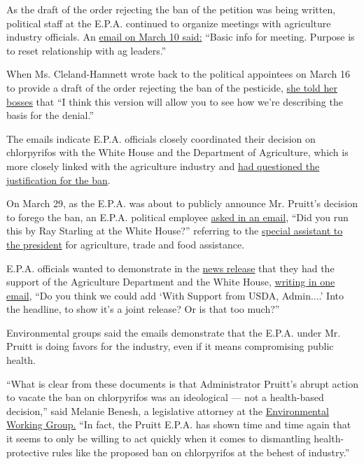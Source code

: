 As the draft of the order rejecting the ban of the petition was being
written, political staff at the E.P.A. continued to organize meetings
with agriculture industry officials. An
\href{https://www.documentcloud.org/documents/3935290-EPA-HQ-2017-005731-Redacted.html\#document/p317/a369104}{email
on March 10 said:} ``Basic info for meeting. Purpose is to reset
relationship with ag leaders.''

When Ms. Cleland-Hamnett wrote back to the political appointees on March
16 to provide a draft of the order rejecting the ban of the pesticide,
\href{https://www.documentcloud.org/documents/3935290-EPA-HQ-2017-005731-Redacted.html\#document/p301/a369109}{she
told her bosses} that ``I think this version will allow you to see how
we're describing the basis for the denial.''

The emails indicate E.P.A. officials closely coordinated their decision
on chlorpyrifos with the White House and the Department of Agriculture,
which is more closely linked with the agriculture industry and
\href{https://www.documentcloud.org/documents/3935263-2017-1-17-USDA-COMMENT-DONT-APPROVE-PETITION.html}{had
questioned the justification for the ban}.

On March 29, as the E.P.A. was about to publicly announce Mr. Pruitt's
decision to forego the ban, an E.P.A. political employee
\href{https://www.documentcloud.org/documents/3935290-EPA-HQ-2017-005731-Redacted.html\#document/p357/a369105}{asked
in an email}, ``Did you run this by Ray Starling at the White House?''
referring to the
\href{https://www.whitehouse.gov/the-press-office/2017/02/27/white-house-national-economic-council-director-announces-senior-staff}{special
assistant to the president} for agriculture, trade and food assistance.

E.P.A. officials wanted to demonstrate in the
\href{https://www.epa.gov/newsreleases/epa-administrator-pruitt-denies-petition-ban-widely-used-pesticide-0}{news
release} that they had the support of the Agriculture Department and the
White House,
\href{https://www.documentcloud.org/documents/3935290-EPA-HQ-2017-005731-Redacted.html\#document/p141/a369102}{writing
in one email}, ``Do you think we could add `With Support from USDA,
Admin....' Into the headline, to show it's a joint release? Or is that
too much?''

Environmental groups said the emails demonstrate that the E.P.A. under
Mr. Pruitt is doing favors for the industry, even if it means
compromising public health.

``What is clear from these documents is that Administrator Pruitt's
abrupt action to vacate the ban on chlorpyrifos was an ideological ---
not a health-based decision,'' said Melanie Benesh, a legislative
attorney at the \href{http://www.ewg.org/}{Environmental Working Group.}
``In fact, the Pruitt E.P.A. has shown time and time again that it seems
to only be willing to act quickly when it comes to dismantling
health-protective rules like the proposed ban on chlorpyrifos at the
behest of industry.''


